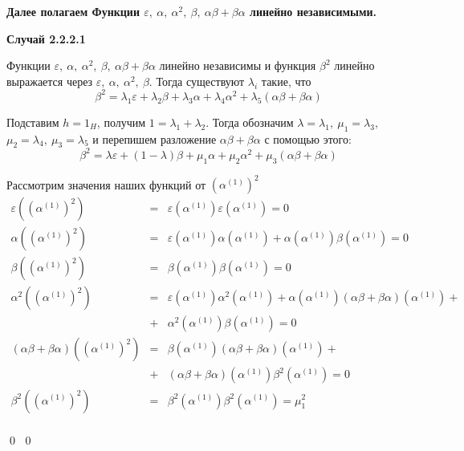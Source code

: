 \documentclass[12pt, reqno, a4paper, oneside, notitlepage]{amsart}
\makeatletter
\theoremstyle{mytheoremstyle}
\theoremstyle{myremarkstyle}
\numberwithin{equation}{section}
\renewenvironment{proof}[1][\proofname]{\par\indent {\bfseries #1\@addpunct{.} }}{\qed}
\makeatother
\begin{document}
\begin{proof}
\begin{proof}
    \textbf{Далее полагаем Функции $\varepsilon,\ \alpha,\ \alpha^2,\ \beta,\ \alpha\beta+\beta\alpha$ линейно независимыми.}

    \textbf{Случай 2.2.2.1}
    
    Функции $\varepsilon,\ \alpha,\ \alpha^2,\ \beta,\ \alpha\beta+\beta\alpha$ линейно независимы и функция $\beta^2$ линейно выражается через $\varepsilon,\ \alpha,\ \alpha^2,\ \beta$.
    Тогда существуют $\lambda_i$ такие, что \[
    \beta^2= \lambda_1\varepsilon+\lambda_2\beta +\lambda_3\alpha+\lambda_4\alpha^2 + \lambda_5(\alpha\beta+\beta\alpha)
     \]

    Подставим $h = 1_H$, получим $1 = \lambda_1+\lambda_2$. Тогда обозначим $\lambda = \lambda_1,\ {\mu_1 = \lambda_3,}$ ${\mu_2 = \lambda_4},\ {\mu_3 = \lambda_5}$ и перепишем разложение $\alpha\beta+\beta\alpha$ с помощью этого: 
    \[
    \beta^2 = \lambda\varepsilon + (1-\lambda)\beta+\mu_1\alpha+\mu_2\alpha^2 +\mu_3(\alpha\beta+\beta\alpha)
    \]

    Рассмотрим значения наших функций от $\left(\alpha^{(1)}\right)^2$
    \begin{eqnarray*}
    \varepsilon\left(\left(\alpha^{(1)}\right)^2\right) &=& 
    \varepsilon\left(\alpha^{(1)}\right)\varepsilon\left(\alpha^{(1)}\right) = 0\\
    \alpha\left(\left(\alpha^{(1)}\right)^2\right) &=&
    \varepsilon\left(\alpha^{(1)}\right)\alpha\left(\alpha^{(1)}\right)+\alpha\left(\alpha^{(1)}\right)\beta\left(\alpha^{(1)}\right) = 0\\
    \beta\left(\left(\alpha^{(1)}\right)^2\right) &=&
    \beta\left(\alpha^{(1)}\right)\beta\left(\alpha^{(1)}\right) = 0\\
    \alpha^2\left(\left(\alpha^{(1)}\right)^2\right) &=&
    \varepsilon\left(\alpha^{(1)}\right)\alpha^2\left(\alpha^{(1)}\right)+
    \alpha\left(\alpha^{(1)}\right)(\alpha\beta+\beta\alpha)\left(\alpha^{(1)}\right)+\\
    &+& \alpha^2\left(\alpha^{(1)}\right)\beta\left(\alpha^{(1)}\right) = 0\\
    (\alpha\beta+\beta\alpha)\left(\left(\alpha^{(1)}\right)^2\right) &=&
    \beta\left(\alpha^{(1)}\right)(\alpha\beta+\beta\alpha)\left(\alpha^{(1)}\right)+\\
    &+&(\alpha\beta+\beta\alpha)\left(\alpha^{(1)}\right)\beta^2\left(\alpha^{(1)}\right) = 0\\
    \beta^2\left(\left(\alpha^{(1)}\right)^2\right) &=& \beta^2\left(\alpha^{(1)}\right)\beta^2\left(\alpha^{(1)}\right) = \mu_1^2\\
    \end{eqnarray*}


\end{proof}
\end{proof}
\end{document}

